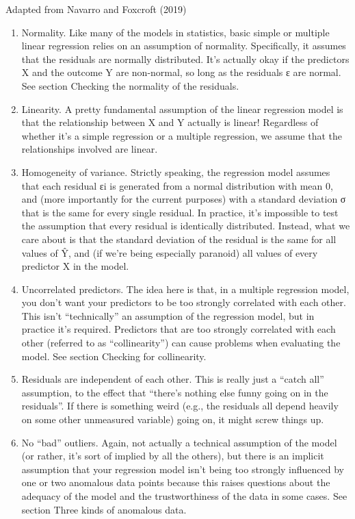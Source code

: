 \documentclass[
]{article}
\providecommand{\tightlist}{%
  \setlength{\itemsep}{0pt}\setlength{\parskip}{0pt}}
\begin{document}
Adapted from Navarro and Foxcroft (2019)

\begin{enumerate}
\def\labelenumi{\arabic{enumi}.}
\tightlist
\item
  Normality. Like many of the models in statistics, basic simple or multiple linear regression relies on an assumption of normality. Specifically, it assumes that the residuals are normally distributed. It's actually okay if the predictors X and the outcome Y are non-normal, so long as the residuals ε are normal. See section Checking the normality of the residuals.
\item
  Linearity. A pretty fundamental assumption of the linear regression model is that the relationship between X and Y actually is linear! Regardless of whether it's a simple regression or a multiple regression, we assume that the relationships involved are linear.
\item
  Homogeneity of variance. Strictly speaking, the regression model assumes that each residual εi is generated from a normal distribution with mean 0, and (more importantly for the current purposes) with a standard deviation σ that is the same for every single residual. In practice, it's impossible to test the assumption that every residual is identically distributed. Instead, what we care about is that the standard deviation of the residual is the same for all values of Ŷ, and (if we're being especially paranoid) all values of every predictor X in the model.
\item
  Uncorrelated predictors. The idea here is that, in a multiple regression model, you don't want your predictors to be too strongly correlated with each other. This isn't ``technically'' an assumption of the regression model, but in practice it's required. Predictors that are too strongly correlated with each other (referred to as ``collinearity'') can cause problems when evaluating the model. See section Checking for collinearity.
\item
  Residuals are independent of each other. This is really just a ``catch all'' assumption, to the effect that ``there's nothing else funny going on in the residuals''. If there is something weird (e.g., the residuals all depend heavily on some other unmeasured variable) going on, it might screw things up.
\item
  No ``bad'' outliers. Again, not actually a technical assumption of the model (or rather, it's sort of implied by all the others), but there is an implicit assumption that your regression model isn't being too strongly influenced by one or two anomalous data points because this raises questions about the adequacy of the model and the trustworthiness of the data in some cases. See section Three kinds of anomalous data.
\end{enumerate}
\end{document}

